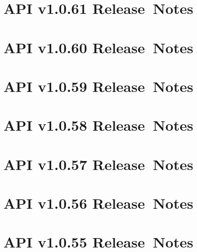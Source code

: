 \documentclass{memoir}%
\begin{document}
%
\section*{API v1.0.61 Release~Notes}%
\paragraph*{}%

%
\section*{API v1.0.60 Release~Notes}%
\paragraph*{}%

%
\section*{API v1.0.59 Release~Notes}%
\paragraph*{}%

%
\section*{API v1.0.58 Release~Notes}%
\paragraph*{}%

%
\section*{API v1.0.57 Release~Notes}%
\paragraph*{}%

%
\section*{API v1.0.56 Release~Notes}%
\paragraph*{}%

%
\section*{API v1.0.55 Release~Notes}%
\end{document}

